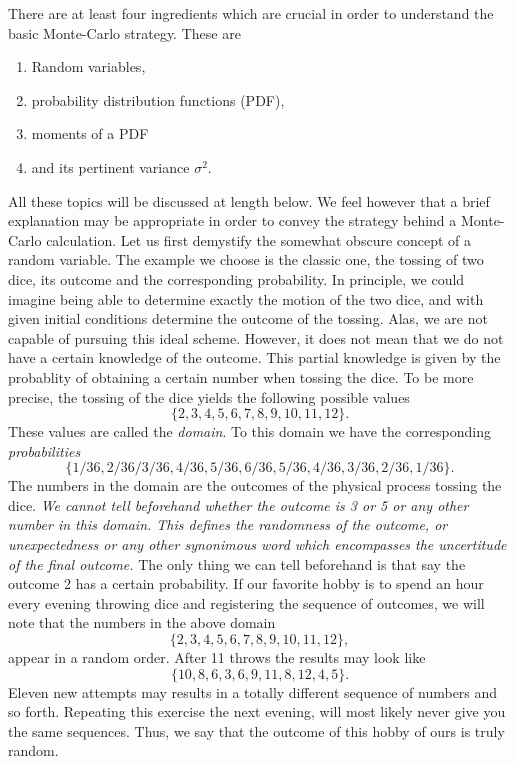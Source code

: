 There are at least four ingredients which are crucial in order to understand the basic
Monte-Carlo strategy. These are
\begin{enumerate}
  \item Random variables,
  \item probability distribution functions (PDF),  
  \item moments of a PDF
  \item and its pertinent variance $\sigma^2$.
\end{enumerate}
All these topics will be discussed at length below. We feel however that a brief explanation
may be appropriate in order to convey the strategy behind a Monte-Carlo calculation. 
Let us first demystify the somewhat obscure concept of a random variable. The example we choose
is the classic one, the tossing of two dice, its outcome and the corresponding probability.
In principle, we could imagine being able to determine exactly the motion of the two dice, and
with given initial conditions determine the outcome of the tossing. Alas, we are not capable of 
pursuing this ideal scheme. However, it does not mean that we do not have a certain knowledge
of the outcome. This partial knowledge is given by the probablity of obtaining a certain
number when tossing the dice. 
To be more precise, the tossing of the dice yields the following
possible values 
\[
\{2,3,4,5,6,7,8,9,10,11,12\}. 
\]
These values are called the {\em domain}. 
To this domain we have the corresponding {\em probabilities}
\[
\{1/36,2/36/3/36,4/36,5/36,6/36,5/36,4/36,3/36,2/36,1/36\}.
\]
The numbers in the domain are the outcomes of the physical process tossing the dice.
{\em We cannot tell beforehand whether the outcome is 3 or 5 or any other number in this domain.
This defines the randomness of the outcome, or unexpectedness or any other synonimous word which
encompasses the uncertitude of the final outcome.} The only thing we can tell beforehand
is that say the outcome 2 has a certain probability.  
If our favorite hobby is to  spend an hour every evening throwing dice and 
registering the sequence of outcomes, we will note that the numbers in the above domain
\[
\{2,3,4,5,6,7,8,9,10,11,12\},
\] 
appear in a random order. After 11 throws the results may look like
\[
\{10,8,6,3,6,9,11,8,12,4,5\}. 
\]
Eleven new attempts may results in a totally different sequence
of numbers and so forth. Repeating this exercise the next evening, will most likely never 
give you the same sequences. Thus, we say that the outcome of this hobby of ours is truly random.

